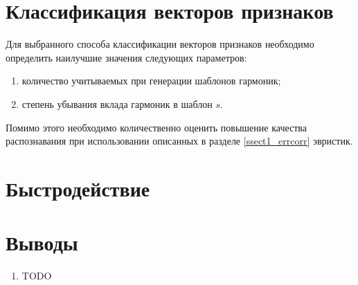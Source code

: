 \section{Классификация векторов признаков} \label{sect3_class}

Для выбранного способа классификации векторов признаков необходимо определить
наилучшие значения следующих параметров:
\begin{enumerate}
  \item количество учитываемых при генерации шаблонов гармоник;
  \item степень убывания вклада гармоник в шаблон $s$.
\end{enumerate}
Помимо этого необходимо количественно оценить повышение качества распознавания
при использовании описанных в разделе \ref{ssect1_errcorr} эвристик.

\section{Быстродействие} \label{sect3_time}

\section{Выводы}

\begin{enumerate}
  \item TODO
\end{enumerate}


\clearpage